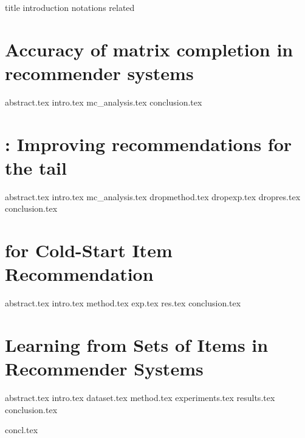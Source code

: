 \documentclass[11pt,oneside]{mnthesis}
\begin{document}
  
  
 
    {title}
    {introduction}
    {notations}
    {related}
    
    \chapter {Accuracy of matrix completion in recommender systems}  \label{ch:matcomp}
    {abstract.tex}
    {intro.tex}
    {mc_analysis.tex}
    {conclusion.tex}
    
    
    \chapter{\TMF: Improving recommendations for the tail} \label{ch:tmf}
    {abstract.tex}
    {intro.tex}
    {mc_analysis.tex}
    {dropmethod.tex}
    {dropexp.tex}
    {dropres.tex}
    {conclusion.tex}

      
    \chapter {\CFEXP for Cold-Start \TOPN Item Recommendation} \label{ch:bilinear}
    {abstract.tex}
    {intro.tex}
    {method.tex}
    {exp.tex}
    {res.tex}
    {conclusion.tex}
    
    
    
    \chapter{Learning from Sets of Items in Recommender Systems} \label{ch:lfs}
    {abstract.tex}
    {intro.tex}
    {dataset.tex}
    {method.tex}
    {experiments.tex}
    {results.tex}
    {conclusion.tex}


    {concl.tex}


  
  
\end{document}
